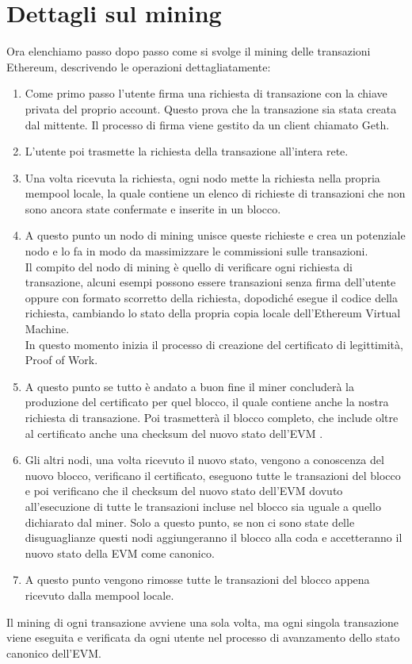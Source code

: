 \documentclass[a4paper,11pt]{report}
\begin{document}
\section{Dettagli sul mining}
Ora elenchiamo passo dopo passo come si svolge il mining delle transazioni Ethereum, descrivendo le operazioni dettagliatamente:
\begin{enumerate} %
\item Come primo passo l'utente firma una richiesta di transazione con la chiave privata del proprio account. Questo prova che la transazione sia stata creata dal mittente. Il processo di firma viene gestito da un client chiamato Geth. 
\item L'utente poi trasmette la richiesta della transazione all'intera rete.
\item Una volta ricevuta la richiesta, ogni nodo mette la richiesta nella propria mempool locale, la quale contiene un elenco di richieste di transazioni che non sono ancora state confermate e inserite in un blocco.
\item A questo punto un nodo di mining unisce queste richieste e crea un potenziale nodo e lo fa in modo da massimizzare le commissioni sulle transazioni.\\ Il compito del nodo di mining è quello di verificare ogni richiesta di transazione, alcuni esempi possono essere transazioni senza firma dell'utente oppure con formato scorretto della richiesta, dopodiché esegue il codice della richiesta, cambiando lo stato della propria copia locale dell'Ethereum Virtual Machine.\\
In questo momento inizia il processo di creazione del certificato di legittimità, Proof of Work.
\item A questo punto se tutto è andato a buon fine il miner concluderà la produzione del certificato per quel blocco, il quale contiene anche la nostra richiesta di transazione. Poi trasmetterà il blocco completo, che include oltre al certificato anche una checksum del nuovo stato dell'EVM .
\item Gli altri nodi, una volta ricevuto il nuovo stato, vengono a conoscenza del nuovo blocco, verificano il certificato, eseguono tutte le transazioni del blocco e poi verificano che il checksum del nuovo stato dell'EVM dovuto all'esecuzione di tutte le transazioni incluse nel blocco sia uguale a quello dichiarato dal miner. Solo a questo punto, se non ci sono state delle disuguaglianze questi nodi aggiungeranno il blocco alla coda e accetteranno il nuovo stato della EVM come canonico.
\item A questo punto vengono rimosse tutte le transazioni del blocco appena ricevuto dalla mempool locale.
\end{enumerate}
Il mining di ogni transazione avviene una sola volta, ma ogni singola transazione viene eseguita e verificata da ogni utente nel processo di avanzamento dello stato canonico dell'EVM.
\end{document}
